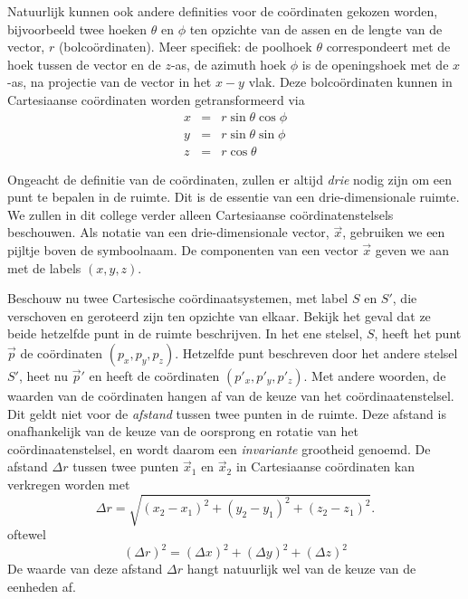 Natuurlijk kunnen ook andere definities voor de co\"ordinaten gekozen
worden, bijvoorbeeld twee hoeken $\theta$ en $\phi$ ten opzichte van de assen en de
lengte van de vector, $r$ (bolco\"ordinaten). Meer specifiek: de 
poolhoek $\theta$ correspondeert met de hoek tussen de vector en de
$z$-as, de azimuth hoek $\phi$ is de openingshoek met de $x$-as, na projectie van de vector in het $x-y$ vlak.
Deze bolco\"ordinaten kunnen in  Cartesiaanse co\"ordinaten worden getransformeerd via
\begin{eqnarray}
x & = & r \sin \theta \cos \phi \\
y & = & r \sin \theta \sin \phi \\
z & = & r \cos \theta
\end{eqnarray}

Ongeacht de definitie van de co\"ordinaten, zullen er altijd {\em
drie} nodig zijn om een punt te bepalen in de ruimte. Dit is de
essentie van een drie-dimensionale ruimte. We zullen in dit college
verder alleen Cartesiaanse co\"ordinatenstelsels beschouwen. Als notatie 
van een drie-dimensionale vector, $\vec{x}$, gebruiken we een pijltje boven de symboolnaam. De componenten van 
een vector $\vec{x}$ geven we aan met de labels $(x,y,z)$.

Beschouw nu twee Cartesische co\"ordinaatsystemen, met label $S$ en
$S'$, die verschoven en geroteerd zijn ten opzichte van elkaar. Bekijk het geval dat ze 
beide hetzelfde punt in de ruimte beschrijven. In het ene stelsel,
$S$, heeft het punt $\vec{p}$ de co\"ordinaten $(p_x,p_y,p_z)$. Hetzelfde punt beschreven door het andere stelsel $S'$, heet nu $\vec{p}'$ en heeft de co\"ordinaten $(p'_x, p'_y,
p'_z)$. Met andere woorden, de waarden van de co\"ordinaten hangen
af van de keuze van het co\"ordinaatenstelsel. Dit geldt niet voor de
{\sl afstand} tussen twee punten in de ruimte. Deze afstand is
onafhankelijk van de keuze van de oorsprong en rotatie van het co\"ordinaatenstelsel, en wordt
daarom een {\sl invariante} grootheid genoemd. De afstand $\Delta r$ tussen twee
punten $\vec{x}_1$ en $\vec{x}_2$ in Cartesiaanse co\"ordinaten kan
verkregen worden met
\[
\Delta r = \sqrt{ (x_2-x_1)^2+(y_2-y_1)^2+(z_2-z_1)^2 }.
\]
oftewel
\[
(\Delta r)^2 = (\Delta x)^2 + (\Delta y)^2 + (\Delta z)^2
\]
De waarde van deze afstand $\Delta r$ hangt natuurlijk wel van de keuze van
de eenheden af.



